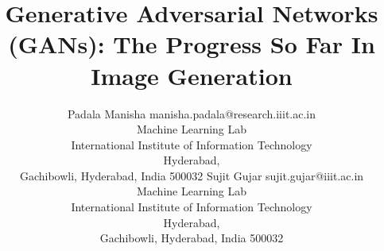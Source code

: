 \documentclass[twoside,11pt]{article}
\begin{document}
\title{Generative Adversarial Networks (GANs): The Progress So Far In Image Generation}

\author{\name Padala Manisha \email manisha.padala@research.iiit.ac.in \\
       \addr Machine Learning Lab\\
       International Institute of Information Technology\\
       Hyderabad, \\Gachibowli, Hyderabad, India 500032
       \AND
       \name Sujit Gujar \email sujit.gujar@iiit.ac.in \\
       \addr Machine Learning Lab \\ 
       International Institute of Information Technology\\
       Hyderabad, \\Gachibowli, Hyderabad, India 500032}

\editor{}%

\maketitle

\end{document}
